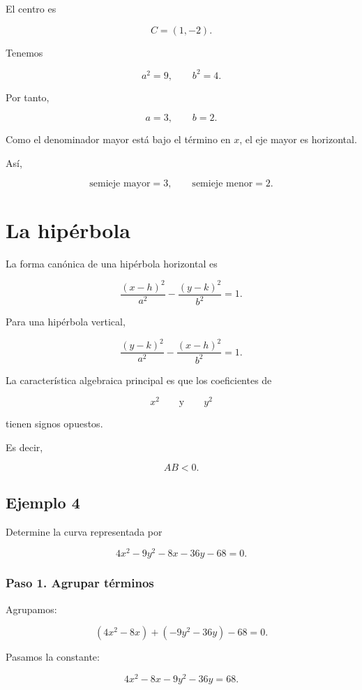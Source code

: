 \documentclass[12pt]{article}
\theoremstyle{plain}
\theoremstyle{definition}
\theoremstyle{remark}
\begin{document}
{El centro es

\[
\boxed{
C=(1,-2).
}
\]

Tenemos

\[
a^2=9,
\qquad
b^2=4.
\]

Por tanto,

\[
a=3,
\qquad
b=2.
\]

Como el denominador mayor está bajo el término en \(x\), el eje mayor es
horizontal.

Así,

\[
\boxed{
\text{semieje mayor}=3,
\qquad
\text{semieje menor}=2.
}
\]

\section*{La hipérbola}

La forma canónica de una hipérbola horizontal es

\[
\boxed{
\frac{(x-h)^2}{a^2}
-
\frac{(y-k)^2}{b^2}
=1.
}
\]

Para una hipérbola vertical,

\[
\boxed{
\frac{(y-k)^2}{a^2}
-
\frac{(x-h)^2}{b^2}
=1.
}
\]

La característica algebraica principal es que los coeficientes de

\[
x^2
\qquad\text{y}\qquad
y^2
\]

tienen signos opuestos.

Es decir,

\[
\boxed{
AB<0.
}
\]

\subsection*{Ejemplo 4}

Determine la curva representada por

\[
4x^2-9y^2-8x-36y-68=0.
\]

\subsubsection*{Paso 1. Agrupar términos}

Agrupamos:

\[
(4x^2-8x)+(-9y^2-36y)-68=0.
\]

Pasamos la constante:

\[
4x^2-8x-9y^2-36y=68.
\]

}
\end{document}
